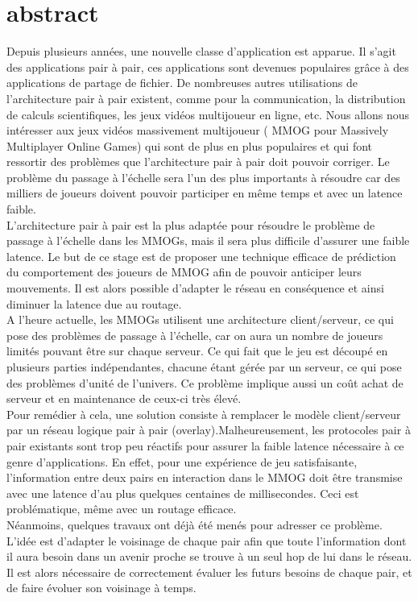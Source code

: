 \section{abstract}

	Depuis plusieurs années, une nouvelle classe d'application est apparue. Il s'agit des applications pair à pair, ces applications sont devenues populaires grâce à des applications de partage de fichier. De nombreuses autres utilisations de l'architecture pair à pair existent, comme pour la communication, la distribution de calculs scientifiques, les jeux vidéos multijoueur en ligne, etc. Nous allons nous intéresser aux jeux vidéos massivement multijoueur ( MMOG pour Massively Multiplayer Online Games) qui sont de plus en plus populaires et qui font ressortir des problèmes que l'architecture pair à pair doit pouvoir corriger. Le problème du passage à l'échelle sera l'un des plus importants à résoudre car des milliers de joueurs doivent pouvoir participer en même temps et avec un latence faible.\\ 
	L'architecture pair à pair est la plus adaptée pour résoudre le problème de passage à l'échelle dans les MMOGs, mais il sera plus difficile d'assurer une faible latence. Le but de ce stage est de proposer une technique efficace de prédiction du comportement des joueurs de MMOG afin de pouvoir anticiper leurs mouvements. Il est alors possible d’adapter le réseau en conséquence et ainsi diminuer la latence due au routage.\\ 
	A l'heure actuelle, les MMOGs utilisent une architecture client/serveur, ce qui pose des problèmes de passage à  l'échelle, car on aura un nombre de joueurs limités pouvant être sur chaque serveur. Ce qui fait que le jeu est découpé en plusieurs parties indépendantes, chacune étant gérée par un serveur, ce qui pose des problèmes d'unité de l'univers. Ce problème implique aussi un coût achat de serveur et en maintenance de ceux-ci très élevé.\\
	Pour remédier à cela, une solution consiste à remplacer le modèle client/serveur par un réseau logique pair à pair (overlay).Malheureusement, les protocoles pair à pair existants sont trop peu réactifs pour assurer la faible latence nécessaire à ce genre d’applications. En effet, pour une expérience de jeu satisfaisante, l’information entre deux pairs en interaction dans le MMOG doit être transmise avec une latence d’au plus quelques centaines de millisecondes. Ceci est problématique, même avec un routage efficace.\\
	Néanmoins, quelques travaux ont déjà été menés pour adresser ce problème. L’idée est d’adapter le voisinage de chaque pair afin que toute l’information dont il aura besoin dans un avenir proche se trouve à un seul hop de lui dans le réseau. Il est alors nécessaire de correctement évaluer les futurs besoins de chaque pair, et de faire évoluer son voisinage à temps.
